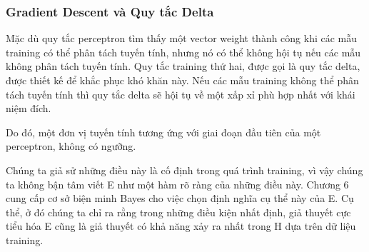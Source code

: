 \subsubsection{Gradient Descent và Quy tắc Delta}

Mặc dù quy tắc perceptron tìm thấy một vector weight thành công khi các mẫu training có thể phân tách tuyến tính, nhưng nó có thể không hội tụ nếu các mẫu không phân tách tuyến tính. Quy tắc training thứ hai, được gọi là quy tắc delta, được thiết kế để khắc phục khó khăn này. Nếu các mẫu training không thể phân tách tuyến tính thì quy tắc delta sẽ hội tụ về một xấp xỉ phù hợp nhất với khái niệm đích.

Do đó, một đơn vị tuyến tính tương ứng với giai đoạn đầu tiên của một perceptron, không có ngưỡng.

Chúng ta giả sử những điều này là cố định trong quá trình training, vì vậy chúng ta không bận tâm viết E như một hàm rõ ràng của những điều này. Chương 6 cung cấp cơ sở biện minh Bayes cho việc chọn định nghĩa cụ thể này của E. Cụ thể, ở đó chúng ta chỉ ra rằng trong những điều kiện nhất định, giả thuyết cực tiểu hóa E cũng là giả thuyết có khả năng xảy ra nhất trong H dựa trên dữ liệu training.

